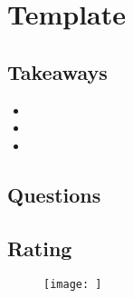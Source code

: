 \documentclass[../main.tex]{subfiles}
\begin{document}
\section{Template}
\subsection{Takeaways}
\begin{itemize}
    \item
    \item
    \item
\end{itemize}
\subsection{Questions}
\begin{itemize}
    \question{}
    \answer{}
    \question{}
    \answer{}
\end{itemize}
\subsection{Rating}
\begin{figure}[bh]
    \centering
    \texttt{[image: ]}
    \caption{}
    \label{img:foo}
\end{figure}
\end{document}
